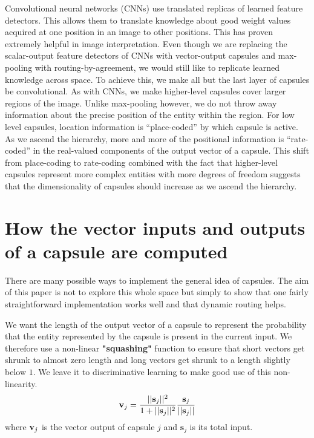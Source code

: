 \documentclass{article}
\begin{document}
Convolutional neural networks (CNNs) use translated replicas of learned feature detectors. This allows them to translate knowledge about good weight values acquired at one position in an image to other positions.  This has proven extremely helpful in image interpretation.  Even though we are replacing the scalar-output feature detectors of CNNs with vector-output capsules and max-pooling with routing-by-agreement, we would still like to replicate learned knowledge across space. To achieve this, we make all but the last layer of capsules be convolutional. As with CNNs, we make higher-level capsules cover larger regions of the image. Unlike max-pooling however, we do not throw away information about the precise position of the entity within the region.  For low level capsules, location information is ``place-coded'' by which capsule is active.  As we ascend the hierarchy, more and more of the positional information is ``rate-coded'' in the real-valued components of the output vector of a capsule. This shift from place-coding to rate-coding combined with the fact that higher-level capsules represent more complex entities with more degrees of freedom suggests that the dimensionality of capsules should increase as we ascend the hierarchy. 

\section{How the vector inputs and outputs of a capsule are computed}

There are many possible ways to implement the general idea of capsules. The aim of this paper is not to explore this whole space but simply to show that one fairly straightforward implementation works well and that dynamic routing helps.

We want the length of the output vector of a capsule to represent the probability that the entity represented by the capsule is present in the current input.
We therefore use a non-linear {\bf "squashing"} function to ensure that short vectors get shrunk to almost zero length and long vectors get shrunk to a length slightly below $1$. We leave it to discriminative learning to make good use of this non-linearity. 
\begin{equation}
{\bf v}_j = \frac{||{\bf s}_j||^2}{1+||{\bf s}_j||^2} \frac{{\bf s}_j}{||{\bf s}_j||}
\label{squash}
\end{equation}
where ${\bf v}_j$ is the vector output of capsule $j$ and ${\mathbf{s}}_j$ is its total input.
 
\end{document}
